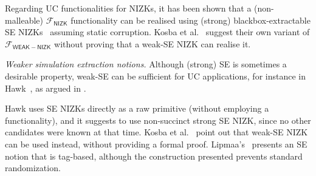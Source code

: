 \documentclass[a4paper, 11pt]{article}
\begin{document}
Regarding UC functionalities for NIZKs, it has been shown that a (non-malleable)
$\mathcal{F}_{\mathsf{NIZK}}$ functionality can be realised using (strong)
blackbox-extractable SE NIZKs~\cite{canetti2002universally, groth2006simulation}
assuming static corruption.
%
Kosba et al.~\cite{kosba2015use,kosba2015c} suggest their own variant of
$\mathcal{F}_{\mathsf{WEAK-NIZK}}$ without proving that a weak-SE NIZK
can realise it.\smallskip

\noindent\emph{Weaker simulation extraction notions.} Although
(strong) SE is sometimes a desirable property, weak-SE can be
sufficient for UC applications, for instance in
Hawk~\cite{kosba2016hawk}, as argued in \cite{kosba2015use,kosba2015c}.

Hawk uses SE NIZKs directly as a raw primitive
(without employing a functionality), and it suggests to use
non-succinct strong SE NIZK, since no other candidates were known at that
time. Kosba et al.~\cite{kosba2015use,kosba2015c} point out that
weak-SE NIZK can be used instead, without providing a formal proof.
%
%
Lipmaa's~\cite{lip19} presents an SE notion that is tag-based, although the
construction presented prevents standard randomization.

\end{document}
